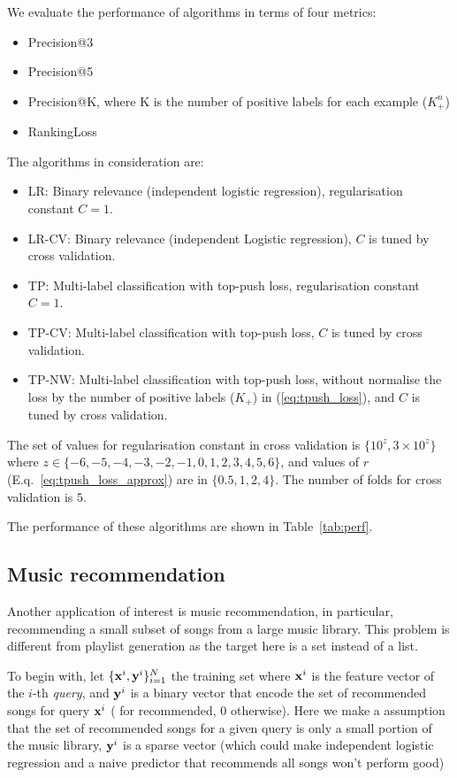 \noindent
We evaluate the performance of algorithms in terms of four metrics:
\begin{itemize}
\item Precision@3
\item Precision@5
\item Precision@K, where K is the number of positive labels for each example (\ie $K_+^n$)
\item RankingLoss
\end{itemize}

\noindent
The algorithms in consideration are:
\begin{itemize}
\item LR: Binary relevance (\ie independent logistic regression), regularisation constant $C = 1$.
\item LR-CV: Binary relevance (\ie independent Logistic regression), $C$ is tuned by cross validation.
\item TP: Multi-label classification with top-push loss, regularisation constant $C=1$.
\item TP-CV: Multi-label classification with top-push loss, $C$ is tuned by cross validation.
\item TP-NW: Multi-label classification with top-push loss, without normalise the loss by the number of positive labels (\ie $K_+$)
             in (\ref{eq:tpush_loss}), and $C$ is tuned by cross validation.
\end{itemize}
The set of values for regularisation constant in cross validation is 
$\{ 10^{z}, 3 \times 10^{z} \}$ where $z \in \{-6, -5, -4, -3, -2, -1, 0, 1, 2, 3, 4, 5, 6\}$,
and values of $r$ (E.q.~\ref{eq:tpush_loss_approx}) are in $\{0.5, 1, 2, 4\}$.
The number of folds for cross validation is $5$.


\noindent
The performance of these algorithms are shown in Table~\ref{tab:perf}.




\subsection{Music recommendation}

Another application of interest is music recommendation, in particular, recommending a small subset of songs from a large music library.
This problem is different from playlist generation%
as the target here is a set instead of a list.

To begin with, let $\{\mathbf{x}^i, \mathbf{y}^i\}_{i=1}^N$ the training set where $\mathbf{x}^i$ is the feature vector of the $i$-th \emph{query},
and $\mathbf{y}^i$ is a binary vector that encode the set of recommended songs for query $\mathbf{x}^i$ ( for recommended, 0 otherwise).
Here we make a assumption that the set of recommended songs for a given query is only a small portion of the music library,
\ie $\mathbf{y}^i$ is a sparse vector (which could make independent logistic regression and a naive predictor that recommends all songs won't perform good)


